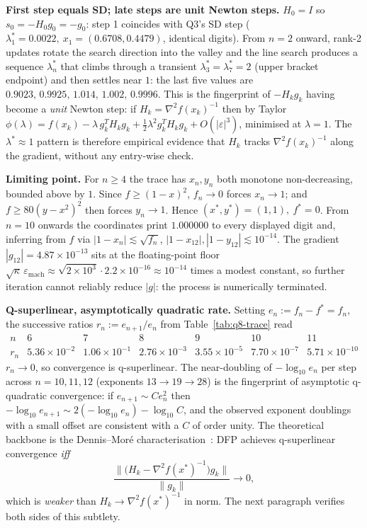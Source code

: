 \documentclass[11pt,a4paper]{article}
\begin{document}
\textbf{First step equals SD; late steps are unit Newton steps.}
\(H_0=I\) so \(s_0=-H_0 g_0=-g_0\): step 1 coincides with Q3's SD step (\(\lambda_1^{\ast}=0.0022,\ x_1=(0.6708,0.4479)\), identical digits). From \(n=2\) onward, rank-2 updates rotate the search direction into the valley and the line search produces a sequence \(\lambda_n^{\ast}\) that climbs through a transient \(\lambda_3^{\ast}=\lambda_7^{\ast}=2\) (upper bracket endpoint) and then settles near \(1\): the last five values are \(0.9023,\,0.9925,\,1.014,\,1.002,\,0.9996\). This is the fingerprint of \(-H_k g_k\) having become a \emph{unit} Newton step: if \(H_k=\nabla^{2}f(x_k)^{-1}\) then by Taylor \(\phi(\lambda)=f(x_k)-\lambda\,g_k^{T}H_k g_k+\tfrac12\lambda^{2}g_k^{T}H_k g_k+O(|\varepsilon|^{3})\), minimised at \(\lambda=1\). The \(\lambda^{\ast}\approx 1\) pattern is therefore empirical evidence that \(H_k\) tracks \(\nabla^{2}f(x_k)^{-1}\) along the gradient, without any entry-wise check.

\textbf{Limiting point.}
For \(n\ge 4\) the trace has \(x_n,y_n\) both monotone non-decreasing, bounded above by \(1\). Since \(f\ge(1-x)^{2}\), \(f_n\to 0\) forces \(x_n\to 1\); and \(f\ge 80(y-x^{2})^{2}\) then forces \(y_n\to 1\). Hence \((x^{\ast},y^{\ast})=(1,1),\ f^{\ast}=0\). From \(n=10\) onwards the coordinates print \(1.000000\) to every displayed digit and, inferring from \(f\) via \(|1-x_n|\lesssim\sqrt{f_n}\), \(|1-x_{12}|,|1-y_{12}|\lesssim 10^{-14}\). The gradient \(|g_{12}|=4.87\!\times\!10^{-13}\) sits at the floating-point floor \(\sqrt{\kappa}\,\varepsilon_{\mathrm{mach}}\approx\sqrt{2\!\times\!10^{3}}\cdot 2.2\!\times\!10^{-16}\approx 10^{-14}\) times a modest constant, so further iteration cannot reliably reduce \(|g|\): the process is numerically terminated.

\textbf{Q-superlinear, asymptotically quadratic rate.}
Setting \(e_n:=f_n-f^{\ast}=f_n\), the successive ratios \(r_n:=e_{n+1}/e_n\) from Table~\ref{tab:q8-trace} read
\[
\begin{array}{c|cccccc}
n & 6 & 7 & 8 & 9 & 10 & 11\\ \hline
r_n & 5.36\!\times\!10^{-2} & 1.06\!\times\!10^{-1} & 2.76\!\times\!10^{-3} & 3.55\!\times\!10^{-5} & 7.70\!\times\!10^{-7} & 5.71\!\times\!10^{-10}
\end{array}
\]
\(r_n\to 0\), so convergence is q-superlinear. The near-doubling of \(-\log_{10}e_n\) per step across \(n=10,11,12\) (exponents \(13\to 19\to 28\)) is the fingerprint of asymptotic q-quadratic convergence: if \(e_{n+1}\sim C e_n^{2}\) then \(-\log_{10}e_{n+1}\sim 2(-\log_{10}e_n)-\log_{10}C\), and the observed exponent doublings with a small offset are consistent with a \(C\) of order unity. The theoretical backbone is the Dennis--Mor\'e characterisation~\cite{dennis-more}: DFP achieves q-superlinear convergence \emph{iff}
\[
\frac{\bigl\|\bigl(H_k-\nabla^{2}f(x^{\ast})^{-1}\bigr)g_k\bigr\|}{\|g_k\|}\longrightarrow 0,
\]
which is \emph{weaker} than \(H_k\to\nabla^{2}f(x^{\ast})^{-1}\) in norm. The next paragraph verifies both sides of this subtlety.
\end{document}
